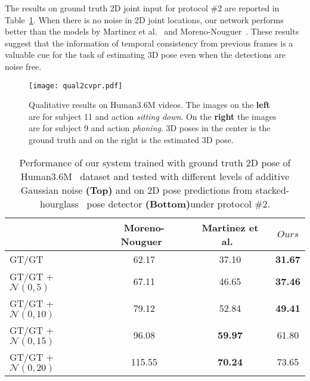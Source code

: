 \documentclass[runningheads]{llncs}
\begin{document}
The results on ground truth 2D joint input for protocol \#2 are reported in Table~\ref{tab:roubst_gt}. When there is no noise in 2D joint locations, our network performs better than the models by Martinez et al.~\cite{JMartinez:ICCV:2017} and Moreno-Nouguer~\cite{distance-matrix}. These results suggest that the information of temporal consistency from previous frames is a valuable cue for the task of estimating 3D pose even when the detections are noise free.
\begin{figure*}[t]
\begin{center}
\texttt{[image: qual2cvpr.pdf]}
\end{center}
\caption{Qualitative results on Human3.6M videos. The images on the \textbf{left} are for subject 11 and action \emph{sitting down}. On the \textbf{right} the images are for subject 9 and action \emph{phoning}. 3D poses in the center is the ground truth and on the right is the estimated 3D pose.}
\vspace{-5mm}
\label{fig:qualt2}  
\end{figure*}

\begin{table}
\begin{center}
\tabcolsep=1mm
\scalebox{0.70}
{\begin{tabular}{@{}lccc@{}}
\hline
 & Moreno-Nouguer~\cite{distance-matrix} & Martinez et al.~\cite{JMartinez:ICCV:2017}& $Ours$\\
\hline
GT/GT                       & 62.17 & 37.10 & \textbf{31.67}\\
GT/GT + $\mathcal{N}(0,5)$  & 67.11  & 46.65 & \textbf{37.46}\\
GT/GT + $\mathcal{N}(0,10)$ & 79.12 & 52.84 & \textbf{49.41}\\
GT/GT + $\mathcal{N}(0,15)$ & 96.08 & \textbf{59.97} & 61.80\\
GT/GT + $\mathcal{N}(0,20)$ & 115.55 & \textbf{70.24} & 73.65\\
\hline
\end{tabular}}
\end{center}
\caption{Performance of our system trained with ground truth 2D pose of Human3.6M~\cite{h36m_pami} dataset and tested with different levels of additive Gaussian noise \textbf{(Top)} and on 2D pose predictions from stacked-hourglass~\cite{stacked-hourglass} pose detector \textbf{(Bottom)}under protocol \#2.} 
\vspace{-5mm}
\label{tab:roubst_gt}
\end{table}
\vspace{-7mm}
\end{document}
